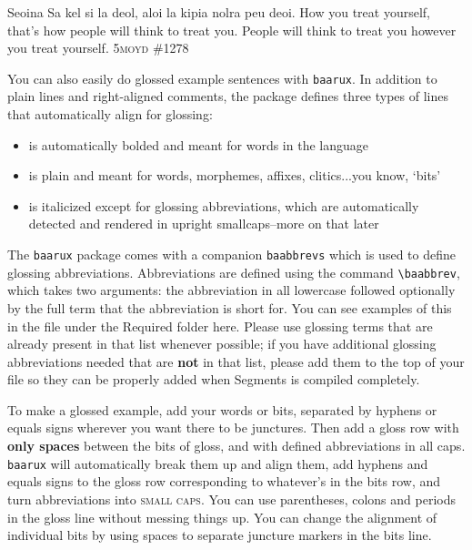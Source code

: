 \begin{verbbox}
\begin{examples}
    \ex \label{ex:seoina}
    \lect Seoina
    \script Sa kel si la deol, aloi la kipia nolra peu deoi.
    \tr How you treat yourself, that's how people will think to treat you.
    \alt People will think to treat you however you treat yourself.
    \source \textsc{5moyd} \#1278
\end{examples}
\end{verbbox}
\fbox{\theverbbox}

You can also easily do glossed example sentences with \texttt{baarux}. In addition to plain lines and right-aligned comments, the package defines three types of lines that automatically align for glossing:

\begin{itemize}
    \item {} is automatically bolded and meant for words in the language
    \item {} is plain and meant for words, morphemes, affixes, clitics...you know, `bits'
    \item {} is italicized except for glossing abbreviations, which are automatically detected and rendered in upright smallcaps--more on that later
\end{itemize}

The \texttt{baarux} package comes with a companion \texttt{baabbrevs} which is used to define glossing abbreviations. Abbreviations are defined using the command \texttt{\textbackslash baabbrev}, which takes two arguments: the abbreviation in all lowercase followed optionally by the full term that the abbreviation is short for. You can see examples of this in the  file under the Required folder here. Please use glossing terms that are already present in that list whenever possible; if you have additional glossing abbreviations needed that are \textbf{not} in that list, please add them to the top of your  file so they can be properly added when Segments is compiled completely.

To make a glossed example, add your words or bits, separated by hyphens or equals signs wherever you want there to be junctures. Then add a gloss row with \textbf{only spaces} between the bits of gloss, and with defined abbreviations in all caps. \texttt{baarux} will automatically break them up and align them, add hyphens and equals signs to the gloss row corresponding to whatever's in the bits row, and turn abbreviations into \textsc{small caps}. You can use parentheses, colons and periods in the gloss line without messing things up. You can change the alignment of individual bits by using spaces to separate juncture markers in the bits line.

